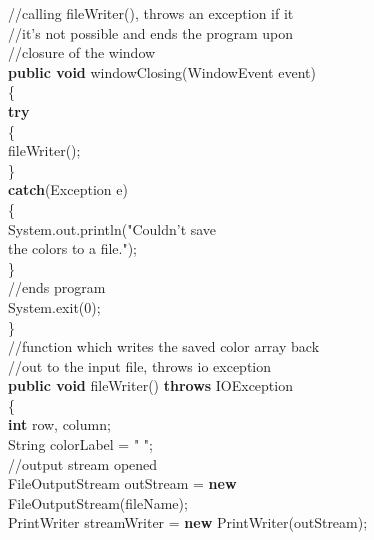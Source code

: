\documentclass[12pt]{article}
\begin{document}
\begin{flushleft}
{\qquad \qquad  \qquad //calling fileWriter(), throws an exception if it\\
\qquad \qquad  \qquad //it's not possible and ends the program upon\\
\qquad \qquad  \qquad //closure of the window\\  
\qquad \qquad  \qquad	\textbf{public void} windowClosing(WindowEvent event)\\
\qquad \qquad  \qquad	\{\\    
\qquad \qquad  \qquad \qquad	\textbf{try}\\
\qquad \qquad  \qquad \qquad	\{\\
\qquad \qquad  \qquad \qquad \qquad	fileWriter();\\
\qquad \qquad  \qquad \qquad	\}\\
\qquad \qquad  \qquad \qquad	\textbf{catch}(Exception e)\\
\qquad \qquad  \qquad \qquad	\{\\
\qquad \qquad  \qquad \qquad \qquad	System.out.println("Couldn't save\\
\qquad \qquad  \qquad \qquad \qquad \qquad \qquad  \qquad \qquad \qquad \qquad \qquad the colors to a file.");\\
\qquad \qquad  \qquad \qquad	\}\\       
				[2mm]
\qquad \qquad  \qquad \qquad	//ends program\\
\qquad \qquad  \qquad \qquad		System.exit(0);\\
\qquad \qquad  \qquad	\}\\           
			[2mm]
\qquad \qquad  \qquad	//function which writes the saved color array back\\
\qquad \qquad  \qquad //out to the input file, throws io exception\\
\qquad \qquad  \qquad	\textbf{public void} fileWriter() \textbf{throws} IOException\\
\qquad \qquad  \qquad	\{\\   
\qquad \qquad  \qquad \qquad	\textbf{int} row, column;\\
\qquad \qquad  \qquad \qquad	String colorLabel = " ";\\
				[2mm]
\qquad \qquad  \qquad \qquad	//output stream opened\\
\qquad \qquad  \qquad \qquad	FileOutputStream outStream = \textbf{new}\\
\qquad \qquad  \qquad \qquad \qquad \qquad  \qquad \qquad \qquad \qquad  \qquad FileOutputStream(fileName);\\
\qquad \qquad  \qquad \qquad	PrintWriter streamWriter = \textbf{new} PrintWriter(outStream);\\
}
\end{flushleft}
\end{document}
